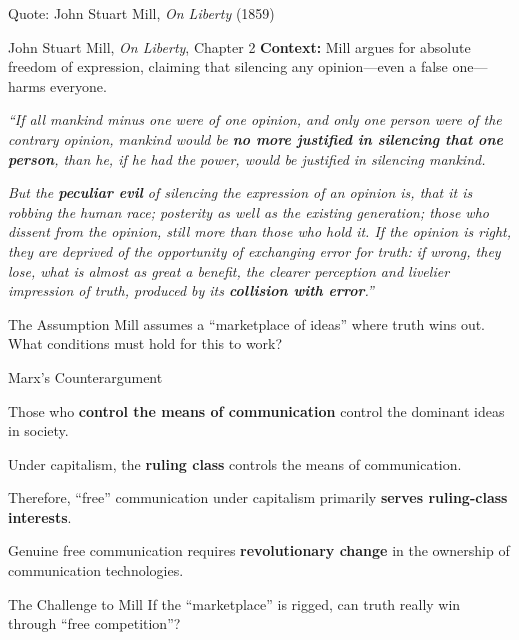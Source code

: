 \documentclass[aspectratio=169]{beamer}
\begin{document}
\begin{frame}{Quote: John Stuart Mill, \textit{On Liberty} (1859)}
\begin{exampleblock}{\faQuoteLeft\hspace{0.5em}John Stuart Mill, \textit{On Liberty}, Chapter 2 \parencite{mill1859liberty}}
\small
\textbf{Context:} Mill argues for absolute freedom of expression, claiming that silencing any opinion---even a false one---harms everyone.

\vspace{0.5em}
\textit{``If all mankind minus one were of one opinion, and only one person were of the contrary opinion, mankind would be \textbf{no more justified in silencing that one person}, than he, if he had the power, would be justified in silencing mankind.}

\vspace{0.3em}
\textit{But the \textbf{peculiar evil} of silencing the expression of an opinion is, that it is robbing the human race; posterity as well as the existing generation; those who dissent from the opinion, still more than those who hold it. If the opinion is right, they are deprived of the opportunity of exchanging error for truth: if wrong, they lose, what is almost as great a benefit, the clearer perception and livelier impression of truth, produced by its \textbf{collision with error}.''}
\end{exampleblock}

\vspace{0.2em}
\begin{block}{\faLightbulb\hspace{0.5em}The Assumption}
Mill assumes a ``marketplace of ideas'' where truth wins out. What conditions must hold for this to work?
\end{block}
\end{frame}

\begin{frame}{Marx's Counterargument}
\begin{argument}
  \item Those who \textbf{control the means of communication} control the dominant ideas in society.
  \item Under capitalism, the \textbf{ruling class} controls the means of communication.
  \item Therefore, ``free'' communication under capitalism primarily \textbf{serves ruling-class interests}.
  \item[\textbf{$\therefore$}] Genuine free communication requires \textbf{revolutionary change} in the ownership of communication technologies.
\end{argument}

\vspace{0.5em}

\vspace{0.3em}
\begin{alertblock}{The Challenge to Mill}
If the ``marketplace'' is rigged, can truth really win through ``free competition''?
\end{alertblock}
\end{frame}
\end{document}
